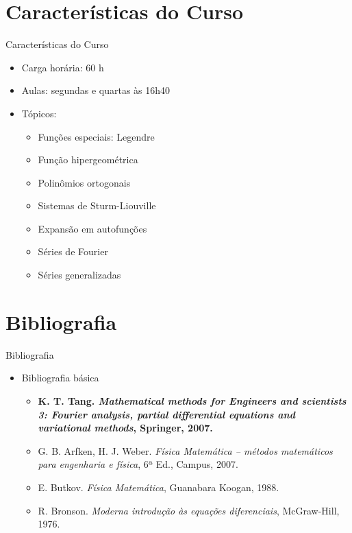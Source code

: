    \section[ slide = true ]{Características do Curso}
      \begin{slide}[toc=]{Características do Curso}
         \begin{itemize}
            \item Carga horária: 60 h
            \item Aulas: segundas e quartas às 16h40
            \item Tópicos:
            \begin{itemize}
               \item Funções especiais: Legendre
               \item Função hipergeométrica
               \item Polinômios ortogonais
	       \item Sistemas de Sturm-Liouville
               \item Expansão em autofunções
               \item Séries de Fourier
	       \item Séries generalizadas
            \end{itemize}
         \end{itemize}         
      \end{slide}
      
   \section[ slide = true ]{Bibliografia}
      \begin{slide}[toc=]{Bibliografia}
         \begin{itemize}
            \item Bibliografia básica
            \begin{itemize}
		    \item \textbf{K. T. Tang. \emph{Mathematical methods for Engineers and scientists 3: Fourier analysis, partial differential equations and variational methods}, Springer, 2007.}
               \item {G. B. Arfken, H. J. Weber. \emph{Física Matemática -- métodos matemáticos para engenharia e física}, 6ª Ed., Campus, 2007.}
               \item {E. Butkov. \emph{Física Matemática}, Guanabara Koogan, 1988.}
               \item {R. Bronson. \emph{Moderna introdução às equações diferenciais}, McGraw-Hill, 1976.}
            \end{itemize}
         \end{itemize}
      \end{slide}

